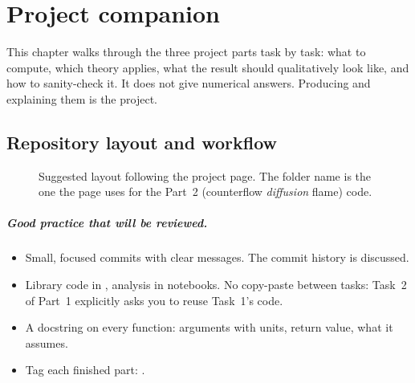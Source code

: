 \chapter{Project companion}
\label{ch:project}

This chapter walks through the three project parts task by task: what to compute, which theory
applies, what the result should qualitatively look like, and how to sanity-check it. It does not
give numerical answers. Producing and explaining them is the project.

\section{Repository layout and workflow}

\begin{figure}[H]
\centering
{}
\caption{Suggested layout following the project page. The folder name 
is the one the page uses for the Part~2 (counterflow \emph{diffusion} flame) code.}
\end{figure}

\paragraph{Good practice that will be reviewed.}
\begin{itemize}
  \item Small, focused commits with clear messages. The commit history is discussed.
  \item Library code in , analysis in notebooks. No copy-paste between tasks: Task~2 of Part~1
        explicitly asks you to reuse Task~1's code.
  \item A docstring on every function: arguments with units, return value, what it assumes.
  \item Tag each finished part: .
\end{itemize}

